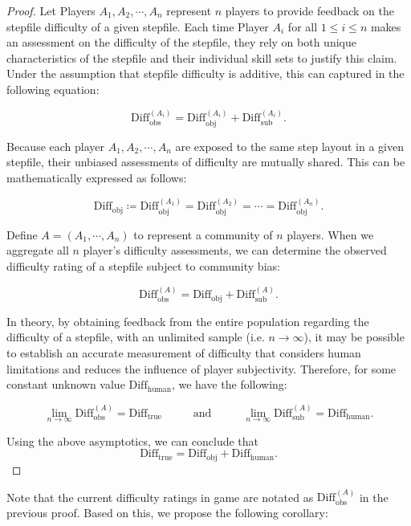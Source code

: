 \begin{proof}
Let Players $A_1, A_2, \cdots, A_n$ represent $n$ players to provide feedback on the stepfile difficulty of a given stepfile. Each time Player $A_i$ for all $1 \leq i \leq n$ makes an assessment on the difficulty of the stepfile, they rely on both unique characteristics of the stepfile and their individual skill sets
to justify this claim. Under the assumption that stepfile difficulty is additive, this can captured in the following equation:

$$\text{Diff}_{\text{obs}}^{(A_i)} = \text{Diff}_{\text{obj}}^{(A_i)} + \text{Diff}_{\text{sub}}^{(A_i)}.$$

Because each player $A_1, A_2, \cdots, A_n$ are exposed to the same step layout in a given stepfile, their unbiased assessments of difficulty are mutually shared. This can be mathematically expressed as follows:

$$\text{Diff}_{\text{obj}} \coloneq \text{Diff}_{\text{obj}}^{(A_1)} = \text{Diff}_{\text{obj}}^{(A_2)} = \cdots = \text{Diff}_{\text{obj}}^{(A_n)}.$$

Define $A = (A_1, \cdots, A_n)$ to represent a community of $n$ players. When we aggregate all $n$ player's difficulty assessments, we can determine the observed difficulty rating of a stepfile subject to community bias:

$$\text{Diff}_{\text{obs}}^{(A)} = \text{Diff}_{\text{obj}} + \text{Diff}_{\text{sub}}^{(A)}.$$

In theory, by obtaining feedback from the entire population regarding the difficulty of a stepfile, with an unlimited sample (i.e. $n \rightarrow \infty$), it may be possible to establish an accurate measurement of difficulty that considers human limitations and reduces the influence of player subjectivity. Therefore, for some constant unknown value $\text{Diff}_{\text{human}}$, we have the following:

$$\lim_{n \rightarrow \infty} \text{Diff}_{\text{obs}}^{(A)} = \text{Diff}_{\text{true}}\mspace{50mu} \text{and} \mspace{50mu} \lim_{n \rightarrow \infty} \text{Diff}_{\text{sub}}^{(A)} = \text{Diff}_{\text{human}}.$$

Using the above asymptotics, we can conclude that
$$\text{Diff}_{\text{true}} = \text{Diff}_{\text{obj}} + \text{Diff}_{\text{human}}.$$
\end{proof}

Note that the current difficulty ratings in game are notated as $\text{Diff}_{\text{obs}}^{(A)}$ in the previous proof. Based on this, we propose the following corollary:

